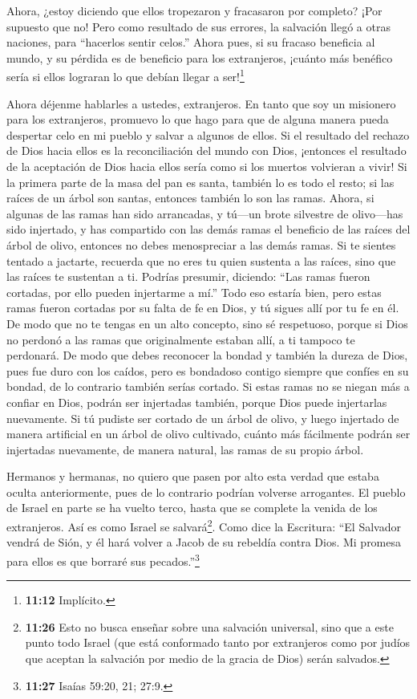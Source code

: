  Ahora, ¿estoy diciendo que ellos tropezaron y fracasaron
por completo? ¡Por supuesto que no! Pero como resultado de sus errores,
la salvación llegó a otras naciones, para ``hacerlos sentir celos.''
 Ahora pues, si su fracaso beneficia al mundo, y su pérdida
es de beneficio para los extranjeros, ¡cuánto más benéfico sería si
ellos lograran lo que debían llegar a ser!\footnote{\textbf{11:12}
  Implícito.}

 Ahora déjenme hablarles a ustedes, extranjeros. En tanto
que soy un misionero para los extranjeros, promuevo lo que hago
 para que de alguna manera pueda despertar celo en mi
pueblo y salvar a algunos de ellos.  Si el resultado del
rechazo de Dios hacia ellos es la reconciliación del mundo con Dios,
¡entonces el resultado de la aceptación de Dios hacia ellos sería como
si los muertos volvieran a vivir!  Si la primera parte de
la masa del pan es santa, también lo es todo el resto; si las raíces de
un árbol son santas, entonces también lo son las ramas. 
Ahora, si algunas de las ramas han sido arrancadas, y tú---un brote
silvestre de olivo---has sido injertado, y has compartido con las demás
ramas el beneficio de las raíces del árbol de olivo, 
entonces no debes menospreciar a las demás ramas. Si te sientes tentado
a jactarte, recuerda que no eres tu quien sustenta a las raíces, sino
que las raíces te sustentan a ti.  Podrías presumir,
diciendo: ``Las ramas fueron cortadas, por ello pueden injertarme a
mí.''  Todo eso estaría bien, pero estas ramas fueron
cortadas por su falta de fe en Dios, y tú sigues allí por tu fe en él.
De modo que no te tengas en un alto concepto, sino sé respetuoso,
 porque si Dios no perdonó a las ramas que originalmente
estaban allí, a ti tampoco te perdonará.  De modo que debes
reconocer la bondad y también la dureza de Dios, pues fue duro con los
caídos, pero es bondadoso contigo siempre que confíes en su bondad, de
lo contrario también serías cortado.  Si estas ramas no se
niegan más a confiar en Dios, podrán ser injertadas también, porque Dios
puede injertarlas nuevamente.  Si tú pudiste ser cortado de
un árbol de olivo, y luego injertado de manera artificial en un árbol de
olivo cultivado, cuánto más fácilmente podrán ser injertadas nuevamente,
de manera natural, las ramas de su propio árbol.

 Hermanos y hermanas, no quiero que pasen por alto esta
verdad que estaba oculta anteriormente, pues de lo contrario podrían
volverse arrogantes. El pueblo de Israel en parte se ha vuelto terco,
hasta que se complete la venida de los extranjeros.  Así es
como Israel se salvará\footnote{\textbf{11:26} Esto no busca enseñar
  sobre una salvación universal, sino que a este punto todo Israel (que
  está conformado tanto por extranjeros como por judíos que aceptan la
  salvación por medio de la gracia de Dios) serán salvados.}. Como dice
la Escritura: ``El Salvador vendrá de Sión, y él hará volver a Jacob de
su rebeldía contra Dios.  Mi promesa para ellos es que
borraré sus pecados.''\footnote{\textbf{11:27} Isaías 59:20, 21; 27:9.}

